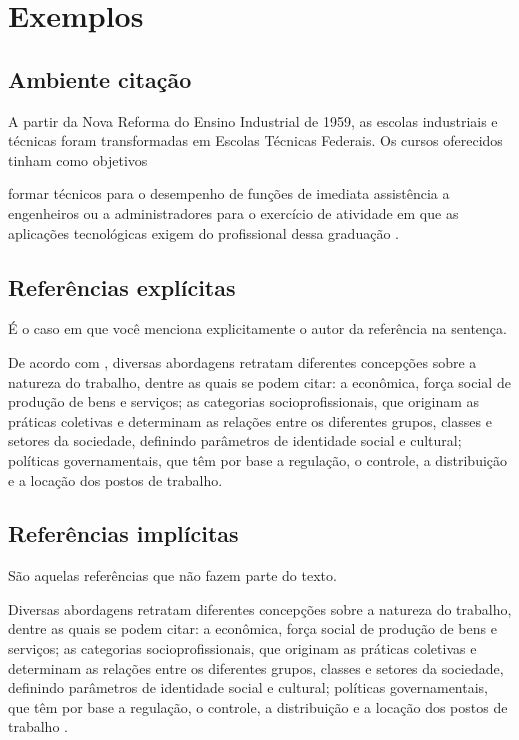 \section{Exemplos}

\subsection{Ambiente citação}

A partir da Nova Reforma do Ensino Industrial de 1959, as escolas industriais e técnicas foram transformadas em Escolas Técnicas Federais. Os cursos oferecidos tinham como objetivos

\begin{citacao}
	formar técnicos para o desempenho de funções de imediata assistência a engenheiros ou a administradores para o exercício de atividade em que as aplicações tecnológicas exigem do profissional dessa graduação \cite{Decreto47038BRASIL1959}.
\end{citacao}

\subsection{Referências explícitas}

É o caso em que você menciona explicitamente o autor da referência na sentença.

De acordo com , diversas abordagens retratam diferentes
concepções sobre a natureza do trabalho, dentre as quais se podem citar: a econômica, força
social de produção de bens e serviços; as categorias socioprofissionais, que originam as práticas
coletivas e determinam as relações entre os diferentes grupos, classes e setores da sociedade,
definindo parâmetros de identidade social e cultural; políticas governamentais, que têm por
base a regulação, o controle, a distribuição e a locação dos postos de trabalho.

\subsection{Referências implícitas}

São aquelas referências que não fazem parte do texto.

Diversas abordagens retratam diferentes
concepções sobre a natureza do trabalho, dentre as quais se podem citar: a econômica, força
social de produção de bens e serviços; as categorias socioprofissionais, que originam as práticas
coletivas e determinam as relações entre os diferentes grupos, classes e setores da sociedade,
definindo parâmetros de identidade social e cultural; políticas governamentais, que têm por
base a regulação, o controle, a distribuição e a locação dos postos de trabalho \cite{Manfredi2002}.

